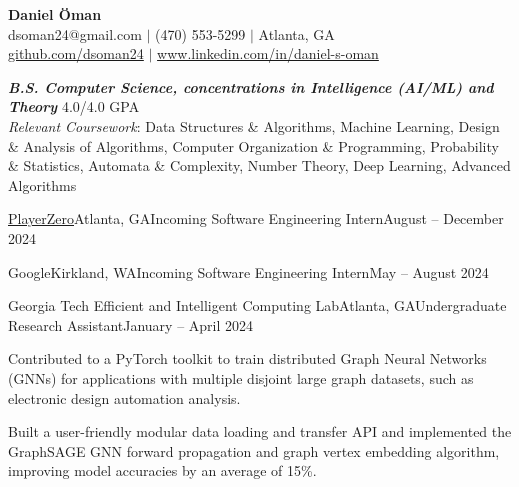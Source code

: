 \documentclass{article}
\begin{document}
\thispagestyle{empty}

\begin{center}
    \textbf{\LARGE Daniel Öman} \\
    dsoman24@gmail.com $|$ (470) 553-5299 $|$ Atlanta, GA \\
    \href{https://github.com/dsoman24}{github.com/dsoman24} $|$ \href{https://www.linkedin.com/in/daniel-s-oman/}{www.linkedin.com/in/daniel-s-oman}
\end{center}

\begin{flushleft}


{\textbf{\textit{B.S. Computer Science, concentrations in Intelligence (AI/ML) and Theory}} \hfill 4.0/4.0 GPA \\ \textit{Relevant Coursework}: Data Structures \& Algorithms, Machine Learning, Design \& Analysis of Algorithms, Computer Organization \& Programming, Probability \& Statistics, Automata \& Complexity, Number Theory, Deep Learning, Advanced Algorithms}


    \begin{experiencenolist}{\href{https://www.playerzero.ai/}{PlayerZero}}{Atlanta, GA}{Incoming Software Engineering Intern}{August -- December 2024}
    \end{experiencenolist}

    \begin{experiencenolist}{Google}{Kirkland, WA}{Incoming Software Engineering Intern}{May -- August 2024}
    \end{experiencenolist}

    \begin{experience}{Georgia Tech Efficient and Intelligent Computing Lab}{Atlanta, GA}{Undergraduate Research Assistant}{January -- April 2024}
        \item Contributed to a PyTorch toolkit to train distributed Graph Neural Networks (GNNs) for applications with multiple disjoint large graph datasets, such as electronic design automation analysis.
        \item Built a user-friendly modular data loading and transfer API and implemented the GraphSAGE GNN forward propagation and graph vertex embedding algorithm, improving model accuracies by an average of 15\%.
    \end{experience}


\end{flushleft}
\end{document}
